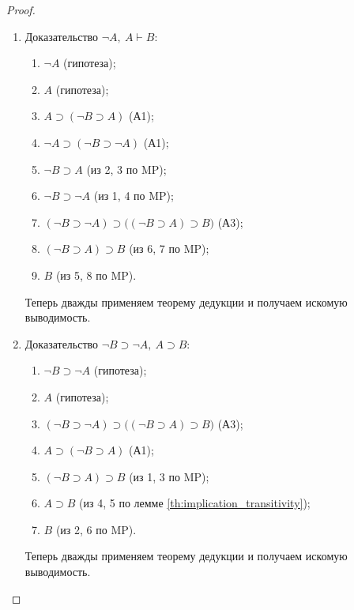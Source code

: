 \begin{proof}\leavevmode
    \begin{enumerate}[label=\arabic*)]
        \item Доказательство $\neg A,\ A \vdash B$:
        \begin{enumerate}[label=\arabic*.]
            \item $\neg A$ (гипотеза);
            \item $A$ (гипотеза);
            \item $A \supset (\neg B \supset A)$ (А1);
            \item $\neg A \supset (\neg B \supset \neg A)$ (А1);
            \item $\neg B \supset A$ (из 2, 3 по MP);
            \item $\neg B \supset \neg A$ (из 1, 4 по MP);
            \item $(\neg B \supset \neg A) \supset \big((\neg B \supset A) \supset B\big)$ (А3);
            \item $(\neg B \supset A) \supset B$ (из 6, 7 по MP);
            \item $B$ (из 5, 8 по MP).
        \end{enumerate}
        Теперь дважды применяем теорему дедукции и получаем искомую выводимость.

        \item Доказательство $\neg B \supset \neg A,\ A \supset B$:
        \begin{enumerate}[label=\arabic*.]
            \item $\neg B \supset \neg A$ (гипотеза);
            \item $A$ (гипотеза);
            \item $(\neg B \supset \neg A) \supset \big((\neg B \supset A) \supset B\big)$ (А3);
            \item $A \supset (\neg B \supset A)$ (А1);
            \item $(\neg B \supset A) \supset B$ (из 1, 3 по MP);
            \item $A \supset B$ (из 4, 5 по лемме \ref{th:implication_transitivity});
            \item $B$ (из 2, 6 по MP).
        \end{enumerate}
        Теперь дважды применяем теорему дедукции и получаем искомую выводимость.


\end{enumerate}
\end{proof}

